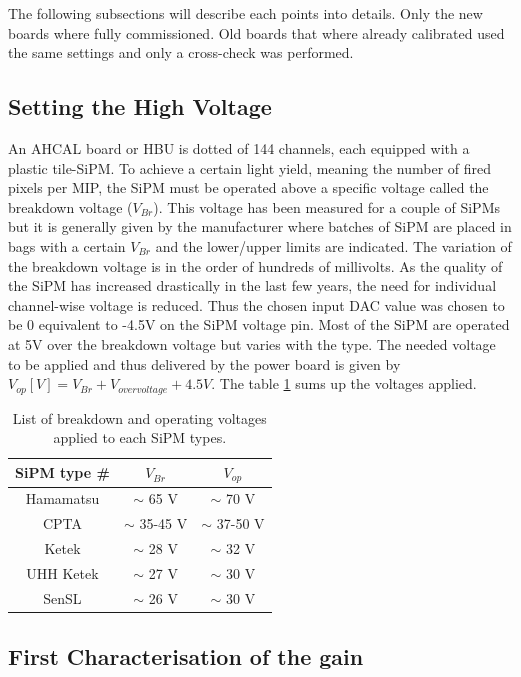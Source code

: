 The following subsections will describe each points into details. Only the new boards where fully commissioned. Old boards that where already calibrated used the same settings and only a cross-check was performed.

\subsection{Setting the High Voltage}

An AHCAL board or HBU is dotted of 144 channels, each equipped with a plastic tile-SiPM. To achieve a certain light yield, meaning the number of fired pixels per MIP, the SiPM must be operated above a specific voltage called the breakdown voltage ($V_{Br}$). This voltage has been measured for a couple of SiPMs but it is generally given by the manufacturer where batches of SiPM are placed in bags with a certain $V_{Br}$ and the lower/upper limits are indicated. The variation of the breakdown voltage is in the order of hundreds of millivolts. As the quality of the SiPM has increased drastically in the last few years, the need for individual channel-wise voltage is reduced. Thus the chosen input DAC value was chosen to be 0 equivalent to -4.5V on the SiPM voltage pin. Most of the SiPM are operated at 5V over the breakdown voltage but varies with the type. The needed voltage to be applied and thus delivered by the power board is given by $V_{op} [V] = V_{Br} + V_{overvoltage} + 4.5V$. The table \ref{table:Voltage_SiPM} sums up the voltages applied.

\begin{table}[htb!]
  \centering
  \caption{List of breakdown and operating voltages applied to each SiPM types.}
  \label{table:Voltage_SiPM}
  \begin{tabular}{@{} ccc @{}}
    \hline
    SiPM type \# & $V_{Br}$ & $V_{op}$ \\
    \hline
    Hamamatsu & $\sim$ 65 V & $\sim$ 70 V \\
    CPTA & $\sim$ 35-45 V & $\sim$ 37-50 V \\
    Ketek & $\sim$ 28 V & $\sim$ 32 V \\
    UHH Ketek & $\sim$ 27 V & $\sim$ 30 V \\
    SenSL & $\sim$ 26 V & $\sim$ 30 V \\
    \hline
  \end{tabular}
\end{table}

\subsection{First Characterisation of the gain}

